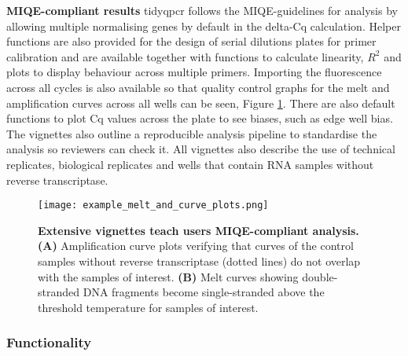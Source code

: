 \documentclass[../main.tex]{subfiles}
\begin{document}
\textbf{MIQE-compliant results} tidyqpcr follows the MIQE-guidelines for analysis by allowing multiple normalising genes by default in the delta-Cq calculation. 
Helper functions are also provided for the design of serial dilutions plates for primer calibration and are available together with functions to calculate linearity, $R^2$ and plots to display behaviour across multiple primers.
Importing the fluorescence across all cycles is also available so that quality control graphs for the melt and amplification curves across all wells can be seen, Figure \ref{fig:plate-amp-curves}.
There are also default functions to plot Cq values across the plate to see biases, such as edge well bias. 
The vignettes also outline a reproducible analysis pipeline to standardise the analysis so reviewers can check it.
All vignettes also describe the use of technical replicates, biological replicates and wells that contain RNA samples without reverse transcriptase.

\begin{figure}[t]

{\centering \texttt{[image: example\_melt\_and\_curve\_plots.png]} 

}

\caption[Extensive vignettes teach users MIQE-compliant analysis.]{\textbf{Extensive vignettes teach users MIQE-compliant analysis.} \textbf{(A)} Amplification curve plots verifying that curves of the control samples without reverse transcriptase (dotted lines) do not overlap with the samples of interest.
\textbf{(B)} Melt curves showing double-stranded DNA fragments become single-stranded above the threshold temperature for samples of interest.} \label{fig:plate-amp-curves}
\end{figure}

\subsubsection{Functionality}
\end{document}
